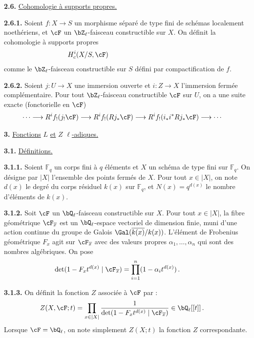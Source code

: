 \bigskip

\noindent
\textbf{2.6.} \underline{Cohomologie \`a supports propres.}

\noindent
\textbf{2.6.1.} Soient $f : X \rightarrow S$ un morphisme s\'epar\'e de type fini de sch\'emas localement noeth\'eriens, et $\cF$ un $\bZ_{\ell}$-faisceau constructible sur $X$. On d\'efinit la cohomologie \`a supports propres
\[
H^i_c(X/S, \cF)\hspace*{4cm}
\]
comme le $\bZ_{\ell}$-faisceau constructible sur $S$ d\'efini par compactification de $f$.

\smallskip

\noindent
\textbf{2.6.2.} Soient $j : U \rightarrow X$ une immersion ouverte et $i : Z \rightarrow X$ l'immersion ferm\'ee compl\'ementaire. Pour tout $\bZ_{\ell}$-faisceau constructible $\cF$ sur $U$, on a une suite exacte (fonctorielle en $\cF$)
\[
\cdots \longrightarrow R^i f_!(j_! \cF) \longrightarrow R^i f_!(Rj_* \cF) \longrightarrow R^i f_!(i_* i^* Rj_* \cF) \longrightarrow \cdots\hspace*{0.5cm}
\]

\bigskip

\noindent
\textbf{3.} \underline{Fonctions} $L$ \underline{et} $Z$ \underline{$\ell$-adiques.}

\noindent
\textbf{3.1.} \underline{D\'efinitions.}

\noindent
\textbf{3.1.1.} Soient $\mathbb{F}_q$ un corps fini \`a $q$ \'el\'ements et $X$ un sch\'ema de type fini sur $\mathbb{F}_q$. On d\'esigne par $|X|$ l'ensemble des points ferm\'es de $X$. Pour tout $x \in |X|$, on note $d(x)$ le degr\'e du corps r\'esiduel $k(x)$ sur $\mathbb{F}_q$, et $N(x) = q^{d(x)}$ le nombre d'\'el\'ements de $k(x)$.

\smallskip

\noindent
\textbf{3.1.2.} Soit $\cF$ un $\bQ_{\ell}$-faisceau constructible sur $X$. Pour tout $x \in |X|$, la fibre g\'eom\'etrique $\cF_{\overline{x}}$ est un $\bQ_{\ell}$-espace vectoriel de dimension finie, muni d'une action continue du groupe de Galois $\Gal(\overline{k(x)}/k(x))$. L'\'el\'ement de Frobenius g\'eom\'etrique $F_x$ agit sur $\cF_{\overline{x}}$ avec des valeurs propres $\alpha_1, \ldots, \alpha_n$ qui sont des nombres alg\'ebriques. On pose
\[
\det(1 - F_x t^{d(x)} \mid \cF_{\overline{x}}) = \prod_{i=1}^{n}(1 - \alpha_i t^{d(x)})\,.\hspace*{1cm}
\]

\smallskip

\noindent
\textbf{3.1.3.} On d\'efinit la fonction $Z$ associ\'ee \`a $\cF$ par :
\[
Z(X, \cF; t) = \prod_{x \in |X|} \frac{1}{\det(1 - F_x t^{d(x)} \mid \cF_{\overline{x}})} \in \bQ_{\ell}[[t]]\,.\hspace*{0.5cm}
\]
Lorsque $\cF = \bQ_{\ell}$, on note simplement $Z(X; t)$ la fonction $Z$ correspondante.


